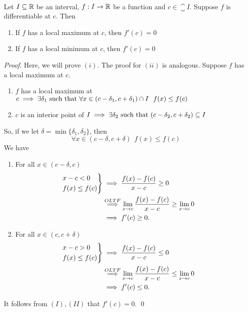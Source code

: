 \begin{theorem} \leavevmode\\
    \label{Thm5.8}
    Let $I\subseteq \mathbb{R}$ be an interval, $f:I \to \mathbb{R}$ be a function and $c \in \closure{I}.$ Suppose $f$ is differentiable at $c$. Then
    \begin{enumerate}[$(i)$]
        \item If $f$ has a local maximum at $c$, then $f'(c) = 0$
        \item If $f$ has a local minimum at $c$, then $f'(c) = 0$
    \end{enumerate}
\end{theorem}

\begin{proof}
    Here, we will prove $(i)$. The proof for $(ii)$ is analogous. Suppose $f$ has a local maximum at $c$.
    \begin{enumerate}
        \item $f$ has a local maximum at $c \implies \exists \delta_1 \text{ such that } \forall x \in (c - \delta_1, c+ \delta_1) \cap I ~~f(x) \leq f(c)$
        \item $c$ is an interior point of $I\implies \exists \delta_2 \text{ such that } (c-\delta_2, c+\delta_2) \subseteq I$
    \end{enumerate}
    So, if we let $\delta = \min \{\delta_1, \delta_2\}$, then
    $$
    \forall x \in (c-\delta, c+\delta) ~~f(x) \leq f(c)
    $$
    We have
    \begin{enumerate}[$(I)$]
        \item For all $x\in (c-\delta, c)$
        \begin{align*}
            \begin{rcases*}
                x -c < 0 \\
                f(x) \leq f(c)
            \end{rcases*} &\implies \slope{f(x)}{f(c)}{x}{c} \geq 0 \\
            &\overset{OLTF}{\implies} \deriv{f}{c} \geq \lims{x}{c} 0 \\
            &\implies f'(c) \geq 0.
        \end{align*}

        \item For all $x\in (c, c+\delta)$
        \begin{align*}
            \begin{rcases*}
                x -c > 0 \\
                f(x) \leq f(c)
            \end{rcases*} &\implies \slope{f(x)}{f(c)}{x}{c} \leq 0 \\
            &\overset{OLTF}{\implies} \deriv{f}{c} \leq \lims{x}{c} 0 \\
            &\implies f'(c) \leq 0.
        \end{align*}
    \end{enumerate}
    It follows from $(I),(II)$ that $f'(c) = 0$. \qed
\end{proof}

